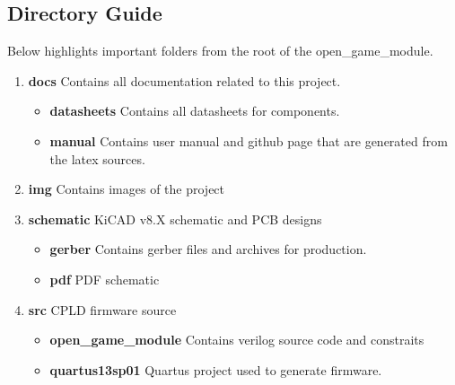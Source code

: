 \subsection{Directory Guide}

\par
Below highlights important folders from the root of the open\_game\_module.

\begin{enumerate}
  \item \textbf{docs} Contains all documentation related to this project.
    \begin{itemize}
      \item \textbf{datasheets} Contains all datasheets for components.
      \item \textbf{manual} Contains user manual and github page that are generated from the latex sources.
    \end{itemize}
  \item \textbf{img} Contains images of the project
  \item \textbf{schematic} KiCAD v8.X schematic and PCB designs
    \begin{itemize}
      \item \textbf{gerber} Contains gerber files and archives for production.
      \item \textbf{pdf} PDF schematic
    \end{itemize}
  \item \textbf{src} CPLD firmware source
    \begin{itemize}
      \item \textbf{open\_game\_module} Contains verilog source code and constraits
      \item \textbf{quartus13sp01} Quartus project used to generate firmware.
    \end{itemize}
\end{enumerate}
